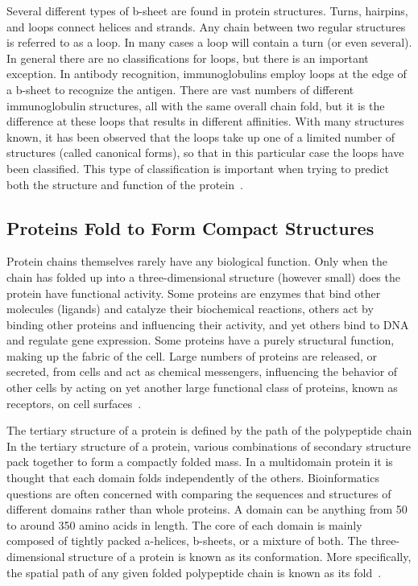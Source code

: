 \documentclass{report}
\begin{document}
Several different types of b-sheet are found in protein structures. Turns, hairpins, and loops connect helices and strands. Any chain between two regular structures is referred to as a loop. In many cases a loop will contain a turn (or even several). In general there are no classifications for loops, but there is an important exception. In antibody recognition, immunoglobulins employ loops at the edge of a b-sheet to recognize the antigen. There are vast numbers of different immunoglobulin structures, all with the same overall chain fold, but it is the difference at these loops that results in different affinities. With many structures known, it has been observed that the loops take up one of a limited number of structures (called canonical forms), so that in this particular case the loops have been classified. This type of classification is important when trying to predict both the structure and function of the protein~\cite{zvelebil_understanding_2008}.

\subsection{Proteins Fold to Form Compact Structures}

Protein chains themselves rarely have any biological function. Only when the chain has folded up into a three-dimensional structure (however small) does the protein have functional activity. Some proteins are enzymes that bind other molecules (ligands) and catalyze their biochemical reactions, others act by binding other proteins and influencing their activity, and yet others bind to DNA and regulate gene expression. Some proteins have a purely structural function, making up the fabric of the cell. Large numbers of proteins are released, or secreted, from cells and act as chemical messengers, influencing the behavior of other cells by acting on yet another large functional class of proteins, known as receptors, on cell surfaces~\cite{zvelebil_understanding_2008}.

The tertiary structure of a protein is defined by the path of the polypeptide chain
In the tertiary structure of a protein, various combinations of secondary structure pack together to form a compactly folded mass. In a multidomain protein it is thought that each domain folds independently of the others. Bioinformatics questions are often concerned with comparing the sequences and structures of different domains rather than whole proteins. A domain can be anything from 50 to around 350 amino acids in length. The core of each domain is mainly composed of tightly packed a-helices, b-sheets, or a mixture of both. The three- dimensional structure of a protein is known as its conformation. More specifically, the spatial path of any given folded polypeptide chain is known as its fold~\cite{zvelebil_understanding_2008}.
\end{document}
